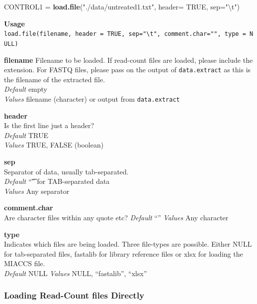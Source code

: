 \documentclass[]{article}
\newenvironment{Shaded}{\begin{snugshade}}{\end{snugshade}}
\newcommand{\KeywordTok}[1]{\textcolor[rgb]{0.13,0.29,0.53}{\textbf{{#1}}}}
\newcommand{\DataTypeTok}[1]{\textcolor[rgb]{0.13,0.29,0.53}{{#1}}}
\newcommand{\CharTok}[1]{\textcolor[rgb]{0.31,0.60,0.02}{{#1}}}
\newcommand{\StringTok}[1]{\textcolor[rgb]{0.31,0.60,0.02}{{#1}}}
\newcommand{\OtherTok}[1]{\textcolor[rgb]{0.56,0.35,0.01}{{#1}}}
\newcommand{\NormalTok}[1]{{#1}}
\begin{document}
\begin{Shaded}
\begin{Highlighting}[]
\NormalTok{CONTROL1 =}\StringTok{ }\KeywordTok{load.file}\NormalTok{(}\StringTok{"./data/untreated1.txt"}\NormalTok{, }\DataTypeTok{header=} \OtherTok{TRUE}\NormalTok{, }\DataTypeTok{sep=}\StringTok{"}\CharTok{\textbackslash{}t}\StringTok{"}\NormalTok{)}
\end{Highlighting}
\end{Shaded}

\textbf{Usage}\\
\texttt{load.file(filename,\ header\ =\ TRUE,\ sep="\textbackslash{}t",\ comment.char="",\ type\ =\ NULL)}

\textbf{filename} Filename to be loaded. If read-count files are loaded,
please include the extension. For FASTQ files, please pass on the output
of \texttt{data.extract} as this is the filename of the extracted
file.\\
\emph{Default} empty\\
\emph{Values} filename (character) or output from \texttt{data.extract}

\textbf{header}\\
Is the first line just a header?\\
\emph{Default} TRUE\\
\emph{Values} TRUE, FALSE (boolean)

\textbf{sep}\\
Separator of data, usually tab-separated.\\
\emph{Default} ``\t'' for TAB-separated data\\
\emph{Values} Any separator

\textbf{comment.char}\\
Are character files within any quote etc? \emph{Default} ``''
\emph{Values} Any character

\textbf{type}\\
Indicates which files are being loaded. Three file-types are possible.
Either NULL for tab-separated files, fastalib for library reference
files or xlsx for loading the MIACCS file.\\
\emph{Default} NULL \emph{Values} NULL, ``fastalib'', ``xlsx''

\subsubsection{Loading Read-Count files
Directly}\label{loading-read-count-files-directly}
\end{document}
